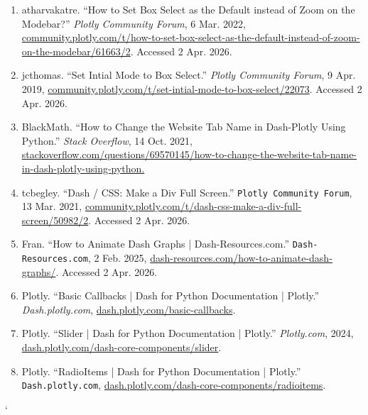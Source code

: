 \documentclass[fontsize=11pt]{article}
\begin{document}
\begin{enumerate}
    \sloppy
    \item atharvakatre. “How to Set Box Select as the Default instead of Zoom on the Modebar?” \textit{Plotly Community Forum}, 6 Mar. 2022, \url{community.plotly.com/t/how-to-set-box-select-as-the-default-instead-of-zoom-on-the-modebar/61663/2}. Accessed 2 Apr. 2026.
    \item jcthomas. “Set Intial Mode to Box Select.” \textit{Plotly Community Forum}, 9 Apr. 2019, \url{community.plotly.com/t/set-intial-mode-to-box-select/22073}. Accessed 2 Apr. 2026.
    \item BlackMath. “How to Change the Website Tab Name in Dash-Plotly Using Python.” \textit{Stack Overflow}, 14 Oct. 2021, \url{stackoverflow.com/questions/69570145/how-to-change-the-website-tab-name-in-dash-plotly-using-python.}
    \item tcbegley. “Dash / CSS: Make a Div Full Screen.” \texttt{Plotly Community Forum}, 13 Mar. 2021, \url{community.plotly.com/t/dash-css-make-a-div-full-screen/50982/2}. Accessed 2 Apr. 2026.
    \item Fran. “How to Animate Dash Graphs | Dash-Resources.com.” \texttt{Dash-Resources.com}, 2 Feb. 2025, \url{dash-resources.com/how-to-animate-dash-graphs/}. Accessed 2 Apr. 2026.
    \item Plotly. “Basic Callbacks | Dash for Python Documentation | Plotly.” \textit{Dash.plotly.com}, \url{dash.plotly.com/basic-callbacks}.
    \item Plotly. “Slider | Dash for Python Documentation | Plotly.” \textit{Plotly.com}, 2024, \url{dash.plotly.com/dash-core-components/slider}.
    \item Plotly. “RadioItems | Dash for Python Documentation | Plotly.” \texttt{Dash.plotly.com}, \url{dash.plotly.com/dash-core-components/radioitems}.
\end{enumerate}`
\end{document}
